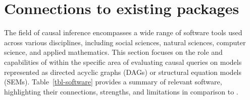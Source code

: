 \documentclass[
  11pt,
  article]{jss}
\begin{document}
\section{Connections to existing
packages}\label{connections-to-existing-packages}

The field of causal inference encompasses a wide range of software tools
used across various disciplines, including social sciences, natural
sciences, computer science, and applied mathematics. This section
focuses on the role and capabilities of  within the
specific area of evaluating causal queries on models represented as
directed acyclic graphs (DAGs) or structural equation models (SEMs).
Table~\ref{tbl-software} provides a summary of relevant software,
highlighting their connections, strengths, and limitations in comparison
to .
\end{document}
